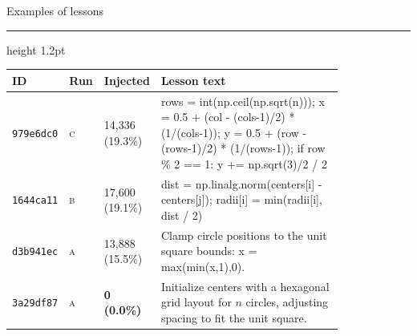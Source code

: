 \documentclass[aspectratio=169]{beamer}
\newcommand{\titlerule}{{\color{titledred}\hrule height 1.2pt}}
\begin{document}
\begin{frame}{Examples of lessons}
\vspace{-0.4em}
\titlerule
\vspace{0.6em}

{\scriptsize
\setlength{\tabcolsep}{4pt}
\begin{center}
\begin{tabular}{p{0.075\linewidth}p{0.03\linewidth}p{0.115\linewidth}p{0.60\linewidth}}
\toprule
ID & Run & Injected & Lesson text \\
\midrule
\texttt{979e6dc0} & \textsc{c} & 14{,}336 (19.3\%) &
{\ttfamily rows = int(np.ceil(np.sqrt(n)));\newline
x = 0.5 + (col - (cols-1)/2) * (1/(cols-1));\newline
y = 0.5 + (row - (rows-1)/2) * (1/(rows-1));\newline
if row \% 2 == 1: y += np.sqrt(3)/2 / 2} \\
\addlinespace
\texttt{1644ca11} & \textsc{b} & 17{,}600 (19.1\%) &
{\ttfamily dist = np.linalg.norm(centers[i] - centers[j]);\newline
radii[i] = min(radii[i], dist / 2)} \\
\addlinespace
\texttt{d3b941ec} & \textsc{a} & 13{,}888 (15.5\%) &
Clamp circle positions to the unit square bounds: {\ttfamily x = max(min(x,1),0)}. \\
\addlinespace
\texttt{3a29df87} & \textsc{a} & \textbf{0 (0.0\%)} &
Initialize centers with a hexagonal grid layout for $n$ circles, adjusting spacing to fit
the unit square. \\
\bottomrule
\end{tabular}
\end{center}
}

\end{frame}
\end{document}

